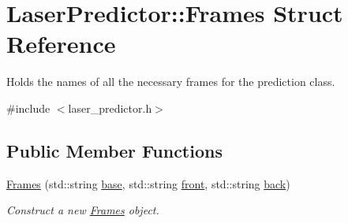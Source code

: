 \hypertarget{structLaserPredictor_1_1Frames}{}\section{Laser\+Predictor\+:\+:Frames Struct Reference}
\label{structLaserPredictor_1_1Frames}


Holds the names of all the necessary frames for the prediction class.  




{\ttfamily \#include $<$laser\+\_\+predictor.\+h$>$}

\subsection*{Public Member Functions}
\begin{DoxyCompactItemize}
\item 
\hyperlink{structLaserPredictor_1_1Frames_a9db5f1195d8982e3d63d981dafe517f4}{Frames} (std\+::string \hyperlink{structLaserPredictor_1_1Frames_a279efa689fc1b142d95055b8d85b0b3e}{base}, std\+::string \hyperlink{structLaserPredictor_1_1Frames_a204e91ead9b16ec6562746d13eb4828a}{front}, std\+::string \hyperlink{structLaserPredictor_1_1Frames_a28b95577e6a88d8211ddaa9f99fb90f4}{back})
\begin{DoxyCompactList}\small\item\em Construct a new \hyperlink{structLaserPredictor_1_1Frames}{Frames} object. \end{DoxyCompactList}\end{DoxyCompactItemize}
